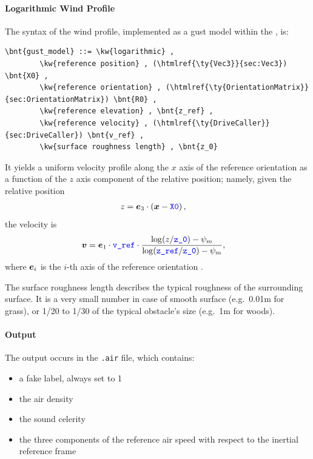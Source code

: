 \paragraph{Logarithmic Wind Profile}
The syntax of the  wind profile, implemented as a gust model
within the , is:
\begin{Verbatim}[commandchars=\\\{\}]
    \bnt{gust_model} ::= \kw{logarithmic} ,
        \kw{reference position} , (\htmlref{\ty{Vec3}}{sec:Vec3}) \bnt{X0} ,
        \kw{reference orientation} , (\htmlref{\ty{OrientationMatrix}}{sec:OrientationMatrix}) \bnt{R0} ,
        \kw{reference elevation} , \bnt{z_ref} ,
        \kw{reference velocity} , (\htmlref{\ty{DriveCaller}}{sec:DriveCaller}) \bnt{v_ref} ,
        \kw{surface roughness length} , \bnt{z_0}
\end{Verbatim}
It yields a uniform velocity profile along the $x$ axis of the
reference orientation as a function of the $z$ axis component
of the relative position; namely, given the relative position
\begin{align}
	z &= \boldsymbol{e}_3 \cdot \left( \boldsymbol{x} - \textcolor{blue}{\texttt{X0}} \right)
	,
\end{align}
the velocity is
\begin{align}
	\boldsymbol{v}
	&=
	\boldsymbol{e}_1 \cdot \textcolor{blue}{\texttt{v\_ref}} \cdot \frac{
		\log(z/\textcolor{blue}{\texttt{z\_0}}) - \psi_m
	}{
		\log(\textcolor{blue}{\texttt{z\_ref}}/\textcolor{blue}{\texttt{z\_0}}) - \psi_m
	}
	,
\end{align}
where $\boldsymbol{e}_i$ is the $i$-th axis of the reference orientation .

The surface roughness length describes the typical roughness
of the surrounding surface.
It is a very small number in case of smooth surface
(e.g.\ 0.01m for grass),
or 1/20 to 1/30 of the typical obstacle's size (e.g.\ 1m for woods).


\paragraph{Output}
The output occurs in the \texttt{.air} file, which contains:
\begin{itemize}
\item a fake label, always set to 1
\item the air density
\item the sound celerity
\item the three components of the reference air speed
with respect to the inertial reference frame
\end{itemize}


